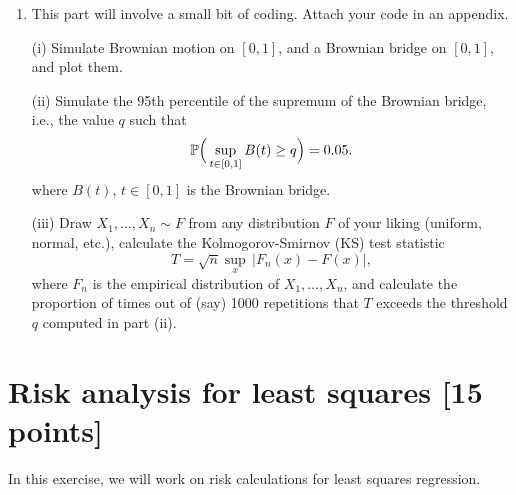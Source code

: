 \documentclass{article}
\begin{document}
\begin{enumerate}[label=(\alph*)]
(i) Prove that $\E[(Y - f(X))^2]$ is minimized at $f(x) = \E[Y|X=x]$.
\marginpar{\small [1 pt]} 

(ii) Prove that $\E[(Y - X^T \beta)^2]$ is minimized at $\beta = \Sigma^{-1} 
\alpha$, where $\Sigma = \E[X X^T]$ and $\alpha = \E[Y X]$.
\marginpar{\small [1 pt]} 

\item This part will involve a small bit of coding. Attach your code in an
  appendix. 

(i) Simulate Brownian motion on $[0,1]$, and a Brownian bridge on $[0,1]$, and
plot them. 
\marginpar{\small [1 pt]} 

(ii) Simulate the 95th percentile of the supremum of the Brownian bridge, i.e.,
the value $q$ such that   
\[
\P\Big( \sup_{t \in [0,1]} B(t)\geq q \Big) = 0.05.
\]
where $B(t)$, $t \in[0,1]$ is the Brownian bridge. 
\marginpar{\small [1 pt]} 

(iii) Draw $X_1,\dots,X_n \sim F$ from any distribution $F$ of your liking
(uniform, normal, etc.), calculate the Kolmogorov-Smirnov (KS) test statistic    
  \[
  T = \sqrt{n} \sup_x \, |F_n(x) - F(x)|,
  \]
  where $F_n$ is the empirical distribution of $X_1,\dots,X_n$, and calculate
  the proportion of times out of (say) 1000 repetitions that $T$ exceeds the 
  threshold $q$ computed in part (ii).  
\marginpar{\small [2 pts]} 
\end{enumerate}

\section{Risk analysis for least squares [15 points]}

\def\Bias{\mathrm{Bias}}
\def\Risk{\mathrm{Risk}}

In this exercise, we will work on risk calculations for least squares regression.
\end{document}
